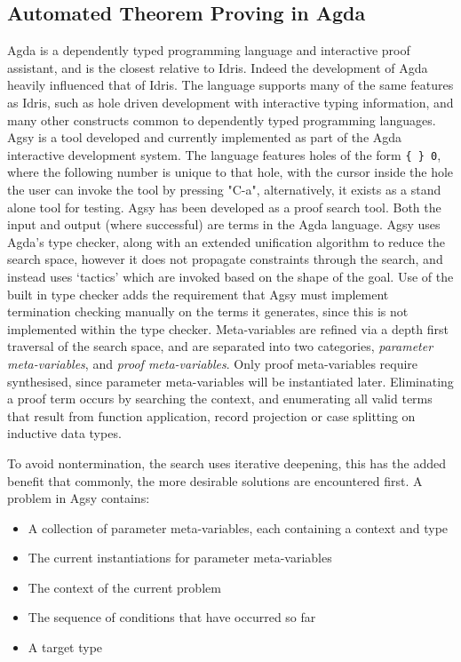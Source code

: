 \documentclass[a4paper]{article}
\begin{document}
\subsection{Automated Theorem Proving in Agda}
\label{sec:orgd7c23cf}
Agda is a dependently typed programming language and interactive proof 
assistant, and is the closest relative to Idris. Indeed the development 
of Agda heavily influenced that of Idris. The language supports many
of the same features as Idris, such as hole driven development with 
interactive typing information, and many other constructs common to 
dependently typed programming languages. Agsy is a tool developed and 
currently implemented as part of the Agda interactive development system.
The language features holes of the form \texttt{\{ \} 0}, where the following
number is unique to that hole, with the cursor inside the hole the user 
can invoke the tool by pressing "C-a", alternatively, it exists as a 
stand alone tool for testing. Agsy has been developed as a proof search 
tool. Both the input and output (where successful) are terms in the Agda 
language. Agsy uses Agda's type checker, along with an extended 
unification algorithm to reduce the search space, however it does not 
propagate constraints through the search, and instead uses `tactics' 
which are invoked based on the shape of the goal. Use of the built in 
type checker adds the requirement that Agsy must implement termination
checking manually on the terms it generates, since this is not 
implemented within the type checker. Meta-variables are refined via a 
depth first traversal of the search space, and are separated into 
two categories, \emph{parameter meta-variables}, and \emph{proof meta-variables}.
Only proof meta-variables require synthesised, since parameter 
meta-variables will be instantiated later. Eliminating a proof term
occurs by searching the context, and enumerating all valid terms that 
result from function application, record projection or case splitting on
inductive data types.

To avoid nontermination, the search uses iterative deepening, this has
the added benefit that commonly, the more desirable solutions are 
encountered first. A problem in Agsy contains:
\begin{itemize}
\item A collection of parameter meta-variables, each containing a context and type
\item The current instantiations for parameter meta-variables
\item The context of the current problem
\item The sequence of conditions that have occurred so far
\item A target type
\end{itemize}
\end{document}

